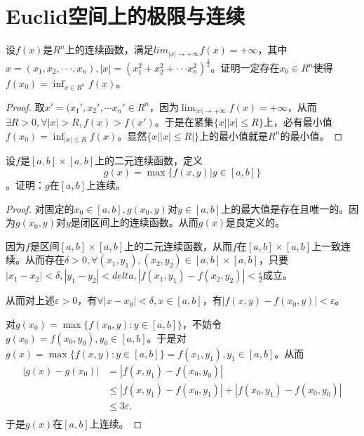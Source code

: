\section{Euclid空间上的极限与连续}

    \begin{exercise}
  设$f(x)$是$R^n$上的连续函数，满足$lim_{|x|\rightarrow+\infty}f(x)=+\infty$，其中$x=(x_1,x_2,\cdot\cdot\cdot,x_n),|x|=(x_1^2+x_2^2+\cdot\cdot\cdot x_n^2)^{\frac12}$。证明一定存在$x_0\in R^n$使得$f(x_0)=\inf_{x\in R^n}f(x)$。%
    \end{exercise}

    \begin{proof}
	取$x'=(x_1',x_2',\cdots x_n'\in R^n$，因为$\lim_{|x|\rightarrow+\infty}f(x)=+\infty$，从而$\exists R>0,\forall|x|>R,f(x)>f(x')$。于是在紧集$\{x||x|\leq R\}$上，必有最小值$f(x_0)=\inf_{|x|\leq R}f(x)$。显然$\{x||x|\leq R|\}$上的最小值就是$R^n$的最小值。
	\end{proof}

	\begin{exercise}
  设$f$是$[a,b]\times[a,b]$上的二元连续函数，定义$$g(x)=\max\{f(x,y)|y\in[a,b]\}$$。证明：$g$在$[a,b]$上连续。%
	\end{exercise}
	
	\begin{proof}
	对固定的$x_0\in[a,b],g(x_0,y)$对$y\in[a,b]$上的最大值是存在且唯一的。因为$g(x_0,y)$对$y$是闭区间上的连续函数。从而$g(x)$是良定义的。
	
	因为$f$是区间$[a,b]\times[a,b]$上的二元连续函数，从而$f$在$[a,b]\times[a,b]$上一致连续。从而存在$\delta>0,\forall(x_1,y_1),(x_2,y_2)\in[a,b]\times[a,b]$，只要$|x_1-x_2|<\delta,|y_1-y_2|<delta,|f(x_1,y_1)-f(x_2,y_2)|<\frac{\varepsilon}{2}$成立。
	
	从而对上述$\varepsilon>0$，有$\forall|x-x_0|<\delta,x\in[a,b]$，有$|f(x,y)-f(x_0,y)|<\varepsilon$。
	
	对$g(x_0)=\max\{f(x_0,y):y\in[a,b]\}$，不妨令$g(x_0)=f(x_0,y_0),y_0\in[a,b]$。于是对$g(x)=\max\{f(x,y):y\in[a,b]\}=f(x_1,y_1),y_1\in[a,b]$。从而
	$$
	\begin{aligned}
	|g(x)-g(x_0)|&=|f(x,y_1)-f(x_0,y_0)|\\
	&\leq|f(x,y_1)-f(x_0,y_1)|+|f(x_0,y_1)-f(x_0,y_0)|\\
	&\leq3\varepsilon.\\
	\end{aligned}
	$$
	于是$g(x)$在$[a,b]$上连续。
	\end{proof}
	
